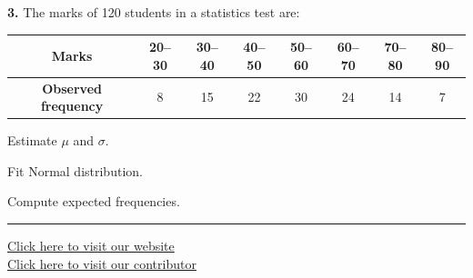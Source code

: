\documentclass[11pt,a4paper]{article}
\begin{document}
\noindent   \textbf{3.} The marks of 120 students in a statistics test are:

\begin{center}

\begin{tabular}{|c|c|c|c|c|c|c|c|}
\hline
   \textbf{Marks} & 20--30 & 30--40 & 40--50 & 50--60 & 60--70 & 70--80 & 80--90 \\
\hline
   \textbf{Observed frequency} & 8 & 15 & 22 & 30 & 24 & 14 & 7 \\
\hline
\end{tabular}
\end{center}

\begin{parts}
  \item Estimate $\mu$ and $\sigma$.
  \item Fit Normal distribution.
  \item Compute expected frequencies.
\end{parts}

\vfill
\rule{\linewidth}{0.4pt}

\begin{center}\small
\href{https://bhu-exam.vercel.app/}{Click here to visit our website}\\[4pt]
\href{https://me-aryan.vercel.app/}{Click here to visit our contributor}
\end{center}
\end{document}
